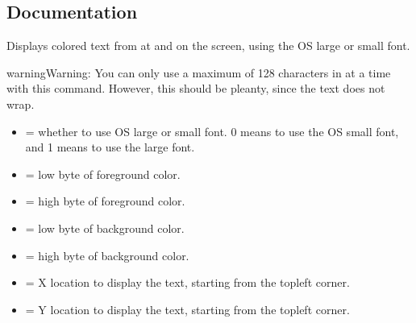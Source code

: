 \documentclass[letterpaper,10pt,english]{sphinxmanual}
\begin{document}
\subsection{Documentation}
\label{\detokenize{dcefunctions:documentation}}\begin{description}
\sphinxAtStartPar
Displays colored text from  at  and  on the screen, using the OS large or small font.

\begin{sphinxadmonition}{warning}{Warning:}
\sphinxAtStartPar
You can only use a maximum of 128 characters in  at a time with this command. However, this should be pleanty, since the text does not wrap.
\end{sphinxadmonition}
\begin{description}
\begin{itemize}
\item {} 
\sphinxAtStartPar
{} = whether to use OS large or small font. 0 means to use the OS small font, and 1 means to use the large font.

\item {} 
\sphinxAtStartPar
{} = low byte of foreground color.

\item {} 
\sphinxAtStartPar
{} = high byte of foreground color.

\item {} 
\sphinxAtStartPar
{} = low byte of background color.

\item {} 
\sphinxAtStartPar
{} = high byte of background color.

\item {} 
\sphinxAtStartPar
{} = X location to display the text, starting from the top\sphinxhyphen{}left corner.

\item {} 
\sphinxAtStartPar
{} = Y location to display the text, starting from the top\sphinxhyphen{}left corner.


\end{itemize}
\end{description}
\end{description}
\end{document}
